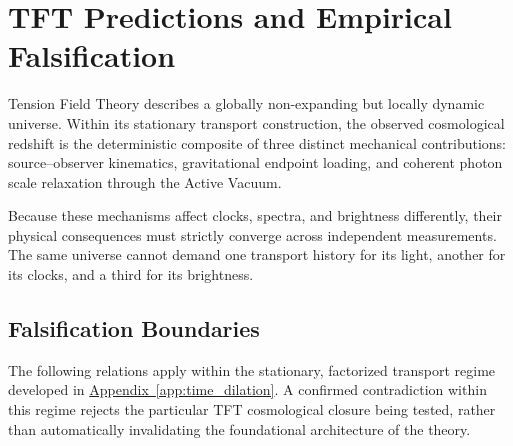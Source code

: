 \section{TFT Predictions and Empirical Falsification}
\label{sec:empirical_falsification}

Tension Field Theory describes a globally non-expanding but locally dynamic universe. Within its stationary transport construction, the observed cosmological redshift is the deterministic composite of three distinct mechanical contributions: source--observer kinematics, gravitational endpoint loading, and coherent photon scale relaxation through the Active Vacuum. 

Because these mechanisms affect clocks, spectra, and brightness differently, their physical consequences must strictly converge across independent measurements. The same universe cannot demand one transport history for its light, another for its clocks, and a third for its brightness.

\subsection*{Falsification Boundaries}

The following relations apply within the stationary, factorized transport regime developed in \hyperref[app:time_dilation]{Appendix~\ref*{app:time_dilation}}. A confirmed contradiction within this regime rejects the particular TFT cosmological closure being tested, rather than automatically invalidating the foundational architecture of the theory.

